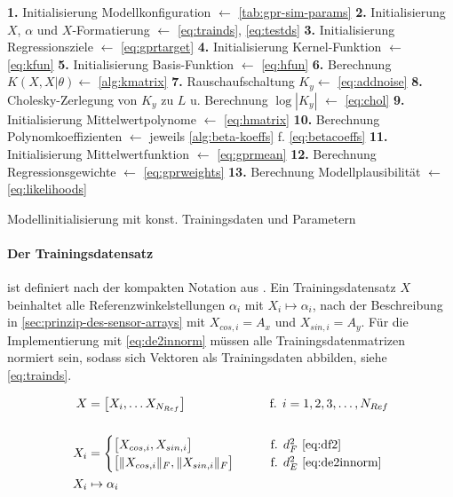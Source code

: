 \begin{algorithm}[bhp]
	\SetAlgoLined
	\textbf{1.} Initialisierung Modellkonfiguration $\leftarrow$ \autoref{tab:gpr-sim-params}\;
	\textbf{2.} Initialisierung $X$, $\alpha$ und $X$-Formatierung $\leftarrow$ \autoref{eq:trainds}, \autoref{eq:testds}\;
	\textbf{3.} Initialisierung Regressionsziele $\leftarrow$ \autoref{eq:gprtarget}\;
	\textbf{4.} Initialisierung Kernel-Funktion $\leftarrow$ \autoref{eq:kfun}\;
	\textbf{5.} Initialisierung Basis-Funktion $\leftarrow$ \autoref{eq:hfun}\;
	\textbf{6.} Berechnung $K(X,X|\theta) \leftarrow$ \autoref{alg:kmatrix}\;
	\textbf{7.} Rauschaufschaltung $K_y \leftarrow$ \autoref{eq:addnoise}\;
	\textbf{8.} Cholesky-Zerlegung von $K_y$ zu $L$ u. Berechnung $\log |K_y|$ $\leftarrow$ \autoref{eq:chol}\;
	\textbf{9.} Initialisierung Mittelwertpolynome $\leftarrow$ \autoref{eq:hmatrix}\;
	\textbf{10.} Berechnung Polynomkoeffizienten $\leftarrow$ jeweils \autoref{alg:beta-koeffs} f. \autoref{eq:betacoeffs}\;
	\textbf{11.} Initialisierung Mittelwertfunktion $\leftarrow$ \autoref{eq:gprmean}\;
	\textbf{12.} Berechnung Regressionsgewichte $\leftarrow$ \autoref{eq:gprweights}\;
	\textbf{13.} Berechnung Modellplausibilität $\leftarrow$ \autoref{eq:likelihoods}\;
	\caption{Modellinitialisierung mit konst. Trainingsdaten und Parametern}
	\label{alg:gprinit}
\end{algorithm}


\clearpage


\paragraph*{Der Trainingsdatensatz} ist definiert nach der kompakten Notation aus \citeauthor{Rasmussen2006}\cite{Rasmussen2006}. Ein Trainingsdatensatz $X$ beinhaltet alle Referenzwinkelstellungen $\alpha_i$ mit $X_i \mapsto \alpha_i$, nach der Beschreibung in \autoref{sec:prinzip-des-sensor-arrays} mit $X_{cos,i} = A_x$ und $X_{sin,i} = A_y$. Für die Implementierung mit \autoref{eq:de2innorm} müssen alle Trainingsdatenmatrizen normiert sein, sodass sich Vektoren als Trainingsdaten abbilden, siehe \autoref{eq:trainds}.


\begin{align}\label{eq:trainds}
	X   &= \big[ X_i, \ldots X_{N_{Ref}} \big] \qquad\qquad\qquad\quad\!  \text{f. } i = 1,2,3,\ldots,N_{Ref} \nonumber \\
	\\
	X_i &= 
		\begin{cases}
			\big[ X_{cos,i}, X_{sin,i} \big]             &\qquad \text{f. } d_F^2 \text{ \eqref{eq:df2}} \\
			\big[ \|X_{cos,i}\|_F, \|X_{sin,i}\|_F \big] &\qquad \text{f. } d_E^2 \text{ \eqref{eq:de2innorm}}
		\end{cases} \nonumber \\
	X_i & \mapsto \alpha_i \nonumber
\end{align}


